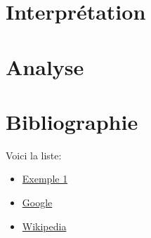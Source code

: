 \documentclass[a4paper,12pt]{article}
\begin{document}
\lipsum[5]



\section{Interprétation}
\lipsum[5]


\section{Analyse}

\lipsum[5]



\section{Bibliographie}

Voici la liste:

\vspace{1em}

\begin{itemize}
	\item \href{https://www.example.com}{Exemple 1}
	\item \href{https://www.google.com}{Google}
	\item \href{https://www.wikipedia.org}{Wikipedia}
\end{itemize}
\end{document}
